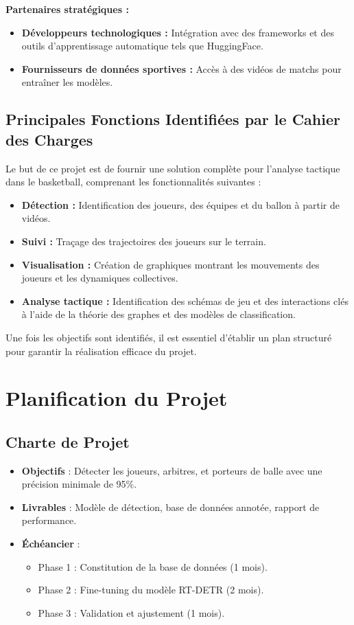 \textbf{Partenaires stratégiques :}
\begin{itemize}
    \item \textbf{Développeurs technologiques :} Intégration avec des frameworks et des outils d’apprentissage automatique tels que HuggingFace.
    \item \textbf{Fournisseurs de données sportives :} Accès à des vidéos de matchs pour entraîner les modèles.
\end{itemize}

\subsection{Principales Fonctions Identifiées par le Cahier des Charges}
Le but de ce projet est de fournir une solution complète pour l’analyse tactique dans le basketball, comprenant les fonctionnalités suivantes :
\begin{itemize}
    \item \textbf{Détection :} Identification des joueurs, des équipes et du ballon à partir de vidéos.
    \item \textbf{Suivi :} Traçage des trajectoires des joueurs sur le terrain.
    \item \textbf{Visualisation :} Création de graphiques montrant les mouvements des joueurs et les dynamiques collectives.
    \item \textbf{Analyse tactique :} Identification des schémas de jeu et des interactions clés à l’aide de la théorie des graphes et des modèles de classification.
\end{itemize}

Une fois les objectifs sont identifiés, il est essentiel d'établir un plan structuré pour garantir la réalisation efficace du projet.


\section{Planification du Projet}
\subsection{Charte de Projet}
\begin{itemize}
    \item \textbf{Objectifs} : Détecter les joueurs, arbitres, et porteurs de balle avec une précision minimale de 95\%.
    \item \textbf{Livrables} : Modèle de détection, base de données annotée, rapport de performance.
    \item \textbf{Échéancier} :
    \begin{itemize}
        \item Phase 1 : Constitution de la base de données (1 mois).
        \item Phase 2 : Fine-tuning du modèle RT-DETR (2 mois).
        \item Phase 3 : Validation et ajustement (1 mois).
    \end{itemize}
\end{itemize}

